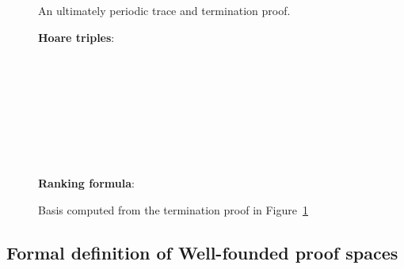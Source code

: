 \documentclass[9pt,nocopyrightspace]{sigplanconf}
\theoremstyle{definition}
\begin{document}
\begin{figure}
  \centering
  
  \hfill
  \caption{An ultimately periodic trace and termination proof. \label{fig:lasso-ex}}
\end{figure}

\begin{figure}
  \textbf{Hoare triples}:
  \begin{center}
      \\
      \\
      \\
      \\
      \\
      \\      
      \\
      
  \end{center}
  \textbf{Ranking formula}: 
    \caption{Basis computed from the termination proof in Figure~\ref{fig:lasso-ex} \label{fig:basis}}
\end{figure}

\subsection{Formal definition of Well-founded proof spaces} \label{sec:formalization}
\end{document}
